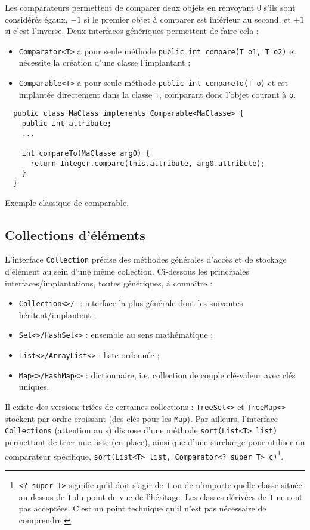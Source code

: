 \documentclass[10pt]{article}
\begin{document}
Les comparateurs permettent de comparer deux objets en renvoyant $0$ s'ils sont considérés égaux, $-1$ si le premier objet à comparer
est inférieur au second, et $+1$ si c'est l'inverse. Deux interfaces génériques permettent de faire cela :
\begin{itemize}
\item \texttt{Comparator<T>} a pour seule méthode \texttt{public int compare(T o1, T o2)} et nécessite la création d'une classe l'implantant ;
\item \texttt{Comparable<T>} a pour seule méthode \texttt{public int compareTo(T o)} et est implantée directement dans la classe \texttt{T}, comparant
  donc l'objet courant à \texttt{o}.
\end{itemize}

\begin{listing}[h!]
\begin{verbatim}
  public class MaClass implements Comparable<MaClasse> {
    public int attribute;
    ...
    
    int compareTo(MaClasse arg0) {
      return Integer.compare(this.attribute, arg0.attribute);
    }
  }
\end{verbatim}
\caption{Exemple classique de comparable.
\label{lst.comparable}}
\end{listing}


\subsection{Collections d'éléments}

L'interface \texttt{Collection} précise des méthodes générales d'accès et de stockage d'élément au sein d'une même collection.
Ci-dessous les principales interfaces/implantations, toutes génériques, à connaître :
\begin{itemize}
\item \texttt{Collection<>/}- : interface la plus générale dont les suivantes héritent/implantent ;
\item \texttt{Set<>/HashSet<>} : ensemble au sens mathématique ;
\item \texttt{List<>/ArrayList<>} : liste ordonnée ;
\item \texttt{Map<>/HashMap<>} : dictionnaire, i.e. collection de couple clé-valeur avec clés uniques.
\end{itemize}
Il existe des versions triées de certaines collections : \texttt{TreeSet<>} et \texttt{TreeMap<>} stockent
par ordre croissant (des clés pour les \texttt{Map}). Par ailleurs, l'interface \texttt{Collections} (attention au s)
dispose d'une méthode \texttt{sort(List<T> list)} permettant de trier une liste (en place), ainsi que d'une
surcharge pour utiliser un comparateur spécifique, \texttt{sort(List<T> list, Comparator<? super T> c)}\footnote{
  \texttt{<? super T>} signifie qu'il doit s'agir de \texttt{T} ou de n'importe quelle classe située au-dessus de \texttt{T}
  du point de vue de l'héritage. Les classes dérivées de \texttt{T} ne sont pas acceptées. C'est un point technique qu'il n'est pas
  nécessaire de comprendre.
}.
\end{document}
